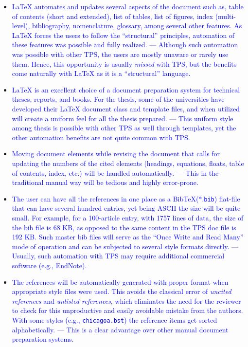 \documentclass[phd]{ndsu-thesis-2022}
\newcommand\italk[1]{\textcolor{blue}{#1}}  %
\newcommand\lx{\LaTeX\xspace}
\newcommand\bx{Bib\!\TeX\xspace}
\newcommand\vb[1]{\textcolor{blue}{\texttt{#1}}}%
\begin{document}
\begin{itemize}[leftmargin=*, itemsep=0pt, parsep=3pt]
\item \italk{\lx automates and updates several aspects of the document such as, table of contents (short and extended), list of tables, list of figures, index (multi-level), bibliography, nomenclature, glossary, among several other features. As \lx forces the users to follow the ``structural'' principles, automation of these features was possible and fully realized. --- Although such automation was possible with other TPS, the users are mostly unaware or rarely use them. Hence, this opportunity is usually \emph{missed} with TPS, but the benefits come naturally with \lx as it is a ``structural'' language.}

\item \italk{\lx is an excellent choice of a document preparation system for technical theses, reports, and books.  For the thesis, some of the universities have developed their \lx document class and template files, and when utilized will create a uniform feel for all the thesis prepared. --- This uniform style among thesis is possible with other TPS as well through templates, yet the other automation benefits are not quite common with TPS.}  

\item \italk{Moving document elements while revising the document that calls for updating the numbers of the cited elements (headings, equations, floats, table of contents, index, etc.) will be handled automatically. --- This in the traditional manual way will be tedious and highly error-prone.}   

\item \italk{The user can have all the references in one place as a \bx  ($\ast$.\vb{bib}) flat-file that can have several hundred entries, yet being ASCII the size will be quite small. For example, for a 100-article entry, with 1757 lines of data, the size of the bib file is 68 KB, as opposed to the same content in the TPS doc file is 192 KB. Such master bib files will serve as the ``Once Write and Read Many'' mode of operation and can be subjected to several style formats directly. --- Usually, such automation with TPS may require additional commercial software (e.g., EndNote).} 

\item \italk{The references will be automatically generated with proper format when appropriate style files were used. This avoids the classical error of \emph{uncited references} and \emph{unlisted references}, which eliminates the need for the reviewer to check for this unproductive and easily avoidable mistake from the authors.  With some styles (e.g., \vb{chicagoa.bst}) the reference items get sorted alphabetically. --- This is a clear advantage over other manual document preparation systems.}   


\end{itemize}
\end{document}
